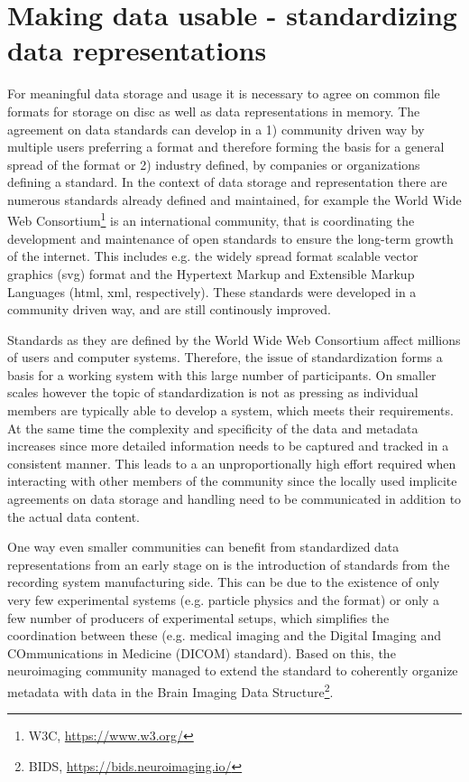 \clearpage
\section{Making data usable - standardizing data representations}
\label{sec:neo}
For meaningful data storage and usage it is necessary to agree on common file formats for storage on disc as well as data representations in memory. The agreement on data standards can develop in a 1) community driven way by multiple users preferring a format and therefore forming the basis for a general spread of the format or 2) industry defined, by companies or organizations defining a standard. In the context of data storage and representation there are numerous standards already defined and maintained, for example the World Wide Web Consortium\footnote{W3C, \url{https://www.w3.org/}} is an international community, that is coordinating the development and maintenance of open standards to ensure the long-term growth of the internet. This includes e.g. the widely spread format scalable vector graphics (svg) format and the Hypertext Markup and Extensible Markup Languages (html, xml, respectively). These standards were developed in a community driven way, and are still continously improved.

Standards as they are defined by the World Wide Web Consortium affect millions of users and computer systems. Therefore, the issue of standardization forms a basis for a working system with this large number of participants. On smaller scales however the topic of standardization is not as pressing as individual members are typically able to develop a system, which meets their requirements. At the same time the complexity and specificity of the data and metadata increases since more detailed information needs to be captured and tracked in a consistent manner. This leads to a an unproportionally high effort required when  interacting with other members of the community since the locally used implicite agreements on data storage and handling need to be communicated in addition to the actual data content.

One way even smaller communities can benefit from standardized data representations from an early stage on is the introduction of standards from the recording system manufacturing side. This can be due to the existence of only very few experimental systems (e.g. particle physics and the  format) or only a few number of producers of experimental setups, which simplifies the coordination between these (e.g. medical imaging and the Digital Imaging and COmmunications in Medicine (DICOM) standard). Based on this, the neuroimaging community managed to extend the standard to coherently organize metadata with data in the Brain Imaging Data Structure\footnote{BIDS, \url{https://bids.neuroimaging.io/}}.

